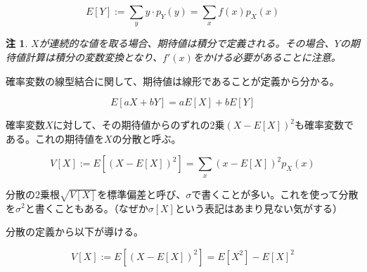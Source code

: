 \documentclass[uplatex,dvipdfmx]{jlreq}
\newcommand\term[1]{\textsf{#1}}
\newtheorem{note}{注}
\begin{document}
\[
    E[Y] := \sum_y y \cdot p_Y(y) = \sum_x f(x)p_X(x)
\]

\begin{note}
    $X$が連続的な値を取る場合、期待値は積分で定義される。その場合、$Y$の期待値計算は積分の変数変換となり、$f'(x)$をかける必要があることに注意。
\end{note}

確率変数の線型結合に関して、期待値は線形であることが定義から分かる。

\[
    E[aX + bY] = aE[X] + bE[Y]
\]

確率変数$X$に対して、その期待値からのずれの2乗$(X-E[X])^2$も確率変数である。これの期待値を$X$の\term{分散}と呼ぶ。

\[
    V[X] := E[(X-E[X])^2] = \sum_x (x-E[X])^2 p_X(x)
\]

分散の2乗根$\sqrt{V[X]}$を\term{標準偏差}と呼び、$\sigma$で書くことが多い。これを使って分散を$\sigma^2$と書くこともある。（なぜか$\sigma[X]$という表記はあまり見ない気がする）

分散の定義から以下が導ける。

\[
    V[X] := E[(X-E[X])^2] = E[X^2] - E[X]^2
\]
\end{document}

